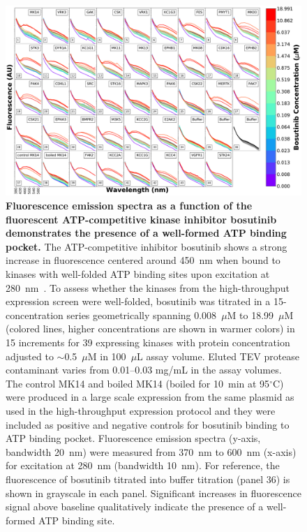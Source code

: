 \documentclass[phd,tocprelim]{cornell}
\begin{document}
\begin{landscape}
	\begin{figure}[p]
		\centering
		\includegraphics[width=0.6\linewidth]{figures/bos_spectra_45_logy}
		 \caption[Fluorescence emission spectra as a function of the fluorescent ATP-competitive kinase inhibitor bosutinib demonstrates the presence of a well-formed ATP binding pocket.]{{\bf Fluorescence emission spectra as a function of the fluorescent ATP-competitive kinase inhibitor bosutinib demonstrates the presence of a well-formed ATP binding pocket.}
			The ATP-competitive inhibitor bosutinib shows a strong increase in fluorescence centered around 450~nm when bound to kinases with well-folded ATP binding sites upon excitation at 280~nm~\cite{levinson-boxer:plos-one:2012:bosutinib}. 
			To assess whether the kinases from the high-throughput expression screen were well-folded, bosutinib was titrated in a 15-concentration series geometrically spanning 0.008~$\mu$M to 18.99~$\mu$M (colored lines, higher concentrations are shown in warmer colors) in 15 increments for 39 expressing kinases with protein concentration adjusted to $\sim$0.5~$\mu$M in 100~$\mu$L assay volume. 
			Eluted TEV protease contaminant varies from 0.01--0.03 mg/mL in the assay volumes.
			The control MK14 and boiled MK14 (boiled for 10~min at 95$^{\circ}$C) were produced in a large scale expression from the same plasmid as used in the high-throughput expression protocol and they were included as positive and negative controls for bosutinib binding to ATP binding pocket.
			Fluorescence emission spectra (y-axis, bandwidth 20~nm) were measured from 370~nm to 600~nm (x-axis) for excitation at 280~nm (bandwidth 10~nm). 
			For reference, the fluorescence of bosutinib titrated into buffer titration (panel 36) is shown in grayscale in each panel. 
			Significant increases in fluorescence signal above baseline qualitatively indicate the presence of a well-formed ATP binding site. 
		}
		\label{fig:binding}
	\end{figure}
\end{landscape}
\end{document}
